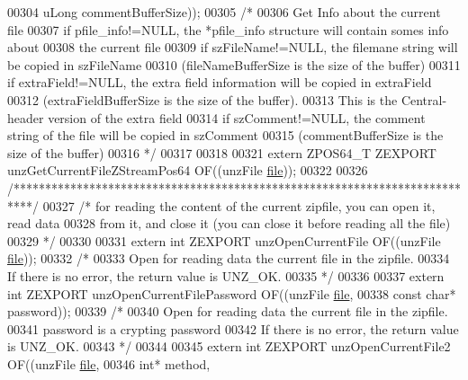 \begin{DoxyCode}
00304                          uLong commentBufferSize));
00305 \textcolor{comment}{/*}
00306 \textcolor{comment}{  Get Info about the current file}
00307 \textcolor{comment}{  if pfile\_info!=NULL, the *pfile\_info structure will contain somes info about}
00308 \textcolor{comment}{        the current file}
00309 \textcolor{comment}{  if szFileName!=NULL, the filemane string will be copied in szFileName}
00310 \textcolor{comment}{            (fileNameBufferSize is the size of the buffer)}
00311 \textcolor{comment}{  if extraField!=NULL, the extra field information will be copied in extraField}
00312 \textcolor{comment}{            (extraFieldBufferSize is the size of the buffer).}
00313 \textcolor{comment}{            This is the Central-header version of the extra field}
00314 \textcolor{comment}{  if szComment!=NULL, the comment string of the file will be copied in szComment}
00315 \textcolor{comment}{            (commentBufferSize is the size of the buffer)}
00316 \textcolor{comment}{*/}
00317 
00318 
00321 \textcolor{keyword}{extern} ZPOS64\_T ZEXPORT unzGetCurrentFileZStreamPos64 OF((unzFile \hyperlink{structfile}{file}));
00322 
00326 \textcolor{comment}{/***************************************************************************/}
00327 \textcolor{comment}{/* for reading the content of the current zipfile, you can open it, read data}
00328 \textcolor{comment}{   from it, and close it (you can close it before reading all the file)}
00329 \textcolor{comment}{   */}
00330 
00331 \textcolor{keyword}{extern} \textcolor{keywordtype}{int} ZEXPORT unzOpenCurrentFile OF((unzFile \hyperlink{structfile}{file}));
00332 \textcolor{comment}{/*}
00333 \textcolor{comment}{  Open for reading data the current file in the zipfile.}
00334 \textcolor{comment}{  If there is no error, the return value is UNZ\_OK.}
00335 \textcolor{comment}{*/}
00336 
00337 \textcolor{keyword}{extern} \textcolor{keywordtype}{int} ZEXPORT unzOpenCurrentFilePassword OF((unzFile \hyperlink{structfile}{file},
00338                                                   \textcolor{keyword}{const} \textcolor{keywordtype}{char}* password));
00339 \textcolor{comment}{/*}
00340 \textcolor{comment}{  Open for reading data the current file in the zipfile.}
00341 \textcolor{comment}{  password is a crypting password}
00342 \textcolor{comment}{  If there is no error, the return value is UNZ\_OK.}
00343 \textcolor{comment}{*/}
00344 
00345 \textcolor{keyword}{extern} \textcolor{keywordtype}{int} ZEXPORT unzOpenCurrentFile2 OF((unzFile \hyperlink{structfile}{file},
00346                                            \textcolor{keywordtype}{int}* method,

\end{DoxyCode}
